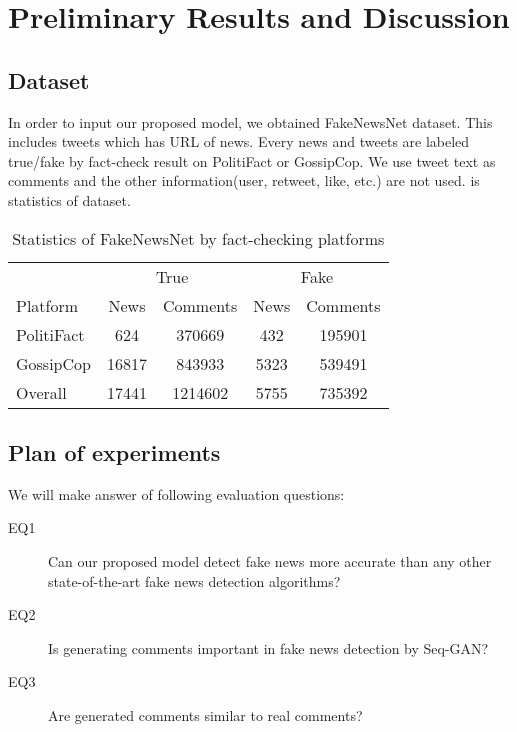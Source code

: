 \section{Preliminary Results and Discussion}
\subsection{Dataset}
In order to input our proposed model, we obtained FakeNewsNet\cite{shu2017exploiting,Shu:2017:FND:3137597.3137600,shu2018fakenewsnet} dataset.
This includes tweets which has URL of news.
Every news and tweets are labeled true/fake by fact-check result on PolitiFact or GossipCop.
We use tweet text as comments and the other information(user, retweet, like, etc.) are not used.
 is statistics of dataset.

\begin{table}[htp]
    \centering
    \caption{Statistics of FakeNewsNet by fact-checking platforms}
    \label{table:fakenewsnet}
    \begin{tabular}{lcccc}
        \hline 
        & \multicolumn{2}{c}{True} & \multicolumn{2}{c}{Fake} \\
        Platform & News & Comments & News & Comments \\
        \hline \hline 
        PolitiFact & 624 & 370669 & 432 & 195901 \\
        GossipCop & 16817 & 843933 & 5323 & 539491 \\
        \hline 
        Overall & 17441 & 1214602 & 5755 & 735392 \\
        \hline 
    \end{tabular}
\end{table}

\subsection{Plan of experiments}
We will make answer of following evaluation questions:
\begin{description}
    \item[EQ1] Can our proposed model detect fake news more accurate than any other state-of-the-art fake news detection algorithms?
    \item[EQ2] Is generating comments important in fake news detection by Seq-GAN?
    \item[EQ3] Are generated comments similar to real comments?
\end{description}

